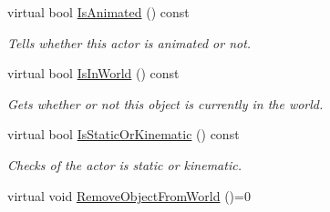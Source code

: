 \begin{DoxyCompactItemize}
virtual bool \hyperlink{classMezzanine_1_1ActorBase_ade1c3e7a2e24df64a79d2acb8d6fc084}{IsAnimated} () const 
\begin{DoxyCompactList}\small\item\em Tells whether this actor is animated or not. \item\end{DoxyCompactList}\item 
virtual bool \hyperlink{classMezzanine_1_1ActorBase_aa2ab7ee3bc4d268d3363de0923426c72}{IsInWorld} () const 
\begin{DoxyCompactList}\small\item\em Gets whether or not this object is currently in the world. \item\end{DoxyCompactList}\item 
virtual bool \hyperlink{classMezzanine_1_1ActorBase_aae73855e5f3cded86c71955cc855026a}{IsStaticOrKinematic} () const 
\begin{DoxyCompactList}\small\item\em Checks of the actor is static or kinematic. \item\end{DoxyCompactList}\item 
\hypertarget{classMezzanine_1_1ActorBase_a774050bfd7c75f2b639005d82dcd5085}{
virtual void \hyperlink{classMezzanine_1_1ActorBase_a774050bfd7c75f2b639005d82dcd5085}{RemoveObjectFromWorld} ()=0}
\label{classMezzanine_1_1ActorBase_a774050bfd7c75f2b639005d82dcd5085}


\end{DoxyCompactItemize}
